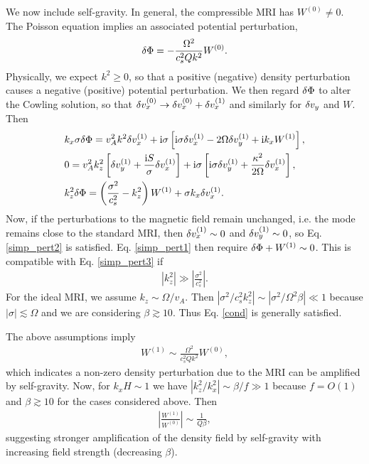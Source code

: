We now include self-gravity. In general, the compressible MRI has
$W^{(0)}\neq0$. The Poisson equation implies
an associated potential perturbation,    
\begin{align} 
  \delta \Phi = -\frac{\Omega^2}{c_s^2 Q k^2} W^{(0)}.
\end{align}
Physically, we expect $k^2\geq0$, so that a positive (negative) density
perturbation causes a negative (positive) potential perturbation. We
then regard $\delta \Phi$ to alter the Cowling solution, so
that $\delta v_x^{(0)} \to \delta v_x^{(0)} + \delta v_x^{(1)}$ and similarly for $\delta v_y$ and
$W$. Then 
\begin{align}
  &   k_x\sigma \delta \Phi = v_A^2k^2\delta v_x^{(1)} + \mathrm{i}\sigma\left[\mathrm{i}\sigma
  \delta v_x^{(1)} - 2\Omega\delta v_y^{(1)} + \mathrm{i} k_x W^{(1)}\right], \label{simp_pert1}\\ 
  &  0= v_A^2k_z^2\left[\delta v_y^{(1)} + \frac{\mathrm{i} S
    }{\sigma}\delta v_x^{(1)}\right] + \mathrm{i}\sigma\left[\mathrm{i}\sigma\delta v_y^{(1)} +
  \frac{\kappa^2}{2\Omega}\delta v_x^{(1)}\right],\label{simp_pert2}\\
  & k_z^2\delta \Phi  = \left(\frac{\sigma^2}{c_s^2}-k_z^2\right)W^{(1)} +
  \sigma k_x \delta v_x^{(1)}.\label{simp_pert3} 
\end{align}
Now, if the perturbations to the magnetic field remain
unchanged, i.e. the mode remains close to the standard MRI, then
$\delta v_x^{(1)} \sim 0$ and $\delta v_y^{(1)}\sim0$, so Eq. \ref{simp_pert2} is
satisfied. Eq. \ref{simp_pert1} then require $\delta \Phi +
W^{(1)}\sim0$. This is compatible with Eq. \ref{simp_pert3} if 
\begin{align}
  \left|k_z^2\right| \gg \left|\frac{\sigma^2}{c_s^2}\right|. \label{cond}
\end{align}
For the ideal MRI,  we assume $k_z\sim \Omega/v_A$. Then
$|\sigma^2/c_s^2k_z^2|\sim |\sigma^2/\Omega^2\beta|\ll1$ because
$|\sigma|\lesssim \Omega$ and we are considering $\beta\gtrsim
10$. Thus Eq. \ref{cond} is generally satisfied.   

The above assumptions imply
\begin{align}
  W^{(1)} \sim \frac{\Omega^2}{c_s^2 Q k^2} W^{(0)},\label{feedback}
\end{align} 
which indicates a non-zero density perturbation due to the
MRI can be amplified by self-gravity. Now, for $k_xH\sim 1$ we have
$|k_z^2/k_x^2|\sim \beta/f\gg1$ because $f=O(1)$ and $\beta\gtrsim10$
for the cases considered above. Then
\begin{align}
  \left|\frac{W^{(1)}}{W^{(0)}}\right| \sim \frac{1}{Q\beta}, 
\end{align}
 suggesting stronger amplification of the density field by 
 self-gravity with increasing field strength (decreasing
 $\beta$). 

